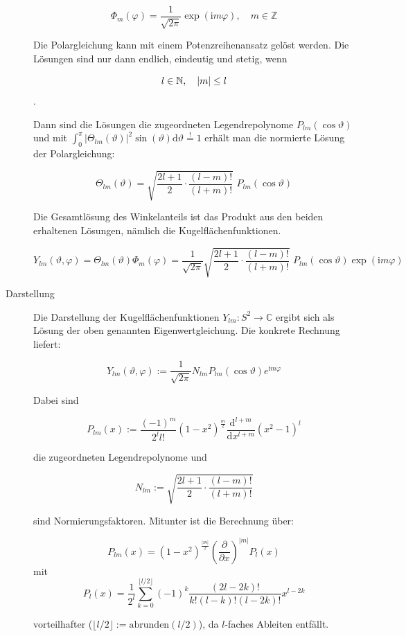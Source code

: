 \begin{definition}
\begin{description}
\[\Phi_{m}(\varphi)=\frac{1}{\sqrt{2\pi}}\exp(\mathrm im\varphi),\quad m\in\mathbb{Z}\]

Die Polargleichung kann mit einem Potenzreihenansatz gelöst werden. Die Lösungen sind nur dann endlich, eindeutig und stetig, wenn

\[l\in\mathbb{N},\quad|m|\leq l\].

Dann sind die Lösungen die zugeordneten Legendrepolynome $P_{lm}(\cos\vartheta)$ und mit $\int_{0}^{\pi}|\Theta_{lm}(\vartheta)|^{2}\sin(\vartheta)\mathrm{d}\vartheta\overset{!}{=}1$ erhält man die normierte Lösung der Polargleichung:

\[\Theta_{lm}(\vartheta)= \sqrt{\frac{2l+1}{2}\cdot\frac{(l-m)!}{(l+m)!}}\,\, P_{lm}(\cos\vartheta)\]

Die Gesamtlösung des Winkelanteils ist das Produkt aus den beiden erhaltenen Lösungen, nämlich die Kugelflächenfunktionen.

\[Y_{lm}(\vartheta,\varphi)=\Theta_{lm}(\vartheta)\Phi_{m}(\varphi)= \frac{1}{\sqrt{2\pi}} \sqrt{\frac{2l+1}{2}\cdot\frac{(l-m)!}{(l+m)!}}\,\, P_{lm}(\cos\vartheta) \exp(\mathrm im\varphi)\]

	\item[Darstellung]


Die Darstellung der Kugelflächenfunktionen $Y_{lm}: S^2\rightarrow \mathbb C $ ergibt sich als Lösung der oben genannten Eigenwertgleichung. Die konkrete Rechnung liefert:

\[Y_{lm}(\vartheta,\varphi) := \frac{1}{\sqrt{2\pi}}N_{lm} P_{lm}(\cos \vartheta)e^{\mathrm im \varphi}\]

Dabei sind

\[P_{lm} (x):=\frac{(-1)^m}{2^ll!}(1-x^2)^{\frac m2} \frac{\mathrm d^{l+m}}{\mathrm dx^{l+m}}(x^2-1)^l\]

die zugeordneten Legendrepolynome und

\[N_{lm} := \sqrt{\frac{2l+1}{2}\cdot\frac{(l-m)!}{(l+m)!}}\]

sind Normierungsfaktoren. Mitunter ist die Berechnung über:

\[P_{lm} (x)=(1-x^2)^{\frac{\left|m\right|}{2}} \left(\frac{\partial}{\partial x}\right)^{\left|m\right|} P_l(x)\]
mit
\[P_l (x)=\frac {1}{2^l}\sum_{k=0}^{\lfloor l/2\rfloor} (-1)^k \frac{(2l-2k)!}{k!(l-k)!(l-2k)!} x^{l-2k}\]

vorteilhafter ($\lfloor l/2\rfloor:={\mathrm{abrunden}}(l/2)$), da $l$-faches Ableiten entfällt.


\end{description}
\end{definition}
